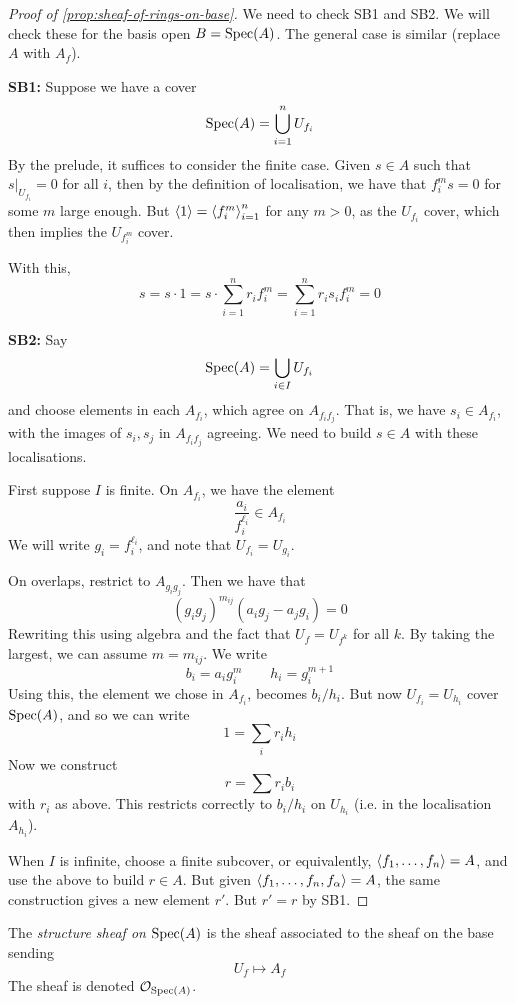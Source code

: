 \documentclass{article}
\begin{document}
\begin{proof}
    [Proof of \cref{prop:sheaf-of-rings-on-base}] We need to check SB1 and SB2. We will check these for the basis open \(B = \operatorname{Spec}(A)\). The general case is similar (replace \(A\) with \(A_f\)).

    \textbf{SB1:} Suppose we have a cover
    \[\operatorname{Spec}(A) = \bigcup_{i=1}^n U_{f_i}\]
    By the prelude, it suffices to consider the finite case. Given \(s \in A\) such that \(s \vert_{U_{f_i}} = 0\) for all \(i\), then by the definition of localisation, we have that \(f_i^m s =0\) for some \(m\) large enough. But \(\left\langle 1 \right\rangle = \left\langle f_i^m \right\rangle_{i=1}^n\) for any \(m > 0\), as the \(U_{f_i}\) cover, which then implies the \(U_{f_i^m}\) cover.

    With this,
    \[s = s \cdot 1 = s \cdot \sum_{i=1}^n r_i f_i^m = \sum_{i=1}^n r_i s_if_i^m = 0\]

    \textbf{SB2:} Say
    \[\operatorname{Spec}(A) = \bigcup_{i \in I}U_{f_i}\]
    and choose elements in each \(A_{f_i}\), which agree on \(A_{f_if_j}\). That is, we have \(s_i \in A_{f_i}\), with the images of \(s_i, s_j\) in \(A_{f_if_j}\) agreeing. We need to build \(s \in A\) with these localisations. 
    
    First suppose \(I\) is finite. On \(A_{f_i}\), we have the element
    \[\frac{a_i}{f_i^{\ell_i}} \in A_{f_i}\]
    We will write \(g_i = f_i^{\ell_i}\), and note that \(U_{f_i} = U_{g_i}\).

    On overlaps, restrict to \(A_{g_ig_j}\). Then we have that
    \[(g_ig_j)^{m_{ij}}(a_i g_j - a_j g_i) = 0\]
    Rewriting this using algebra and the fact that \(U_f = U_{f^k}\) for all \(k\). By taking the largest, we can assume \(m = m_{ij}\). We write
    \[b_i = a_i g_i^m \qquad h_i = g_i^{m+1}\]
    Using this, the element we chose in \(A_{f_i}\), becomes \(b_i/h_i\). But now \(U_{f_i} = U_{h_i}\) cover \(\operatorname{Spec}(A)\), and so we can write
    \[1 = \sum_i r_i h_i\]
    Now we construct
    \[r = \sum r_i b_i\]
    with \(r_i\) as above. This restricts correctly to \(b_i/h_i\) on \(U_{h_i}\) (i.e. in the localisation \(A_{h_i}\)).

    When \(I\) is infinite, choose a finite subcover, or equivalently, \(\left\langle f_1, \dots, f_n \right\rangle = A\), and use the above to build \(r \in A\). But given \(\left\langle f_1, \dots, f_n, f_\alpha \right\rangle = A\), the same construction gives a new element \(r'\). But \(r' = r\) by SB1.
\end{proof}

\begin{definition}
    The \emph{structure sheaf on \(\operatorname{Spec}(A)\)} is the sheaf associated to the sheaf on the base sending
    \[U_f \mapsto A_f\]
    The sheaf is denoted \(\mathcal{O}_{\operatorname{Spec}(A)}\).
\end{definition}
\end{document}
